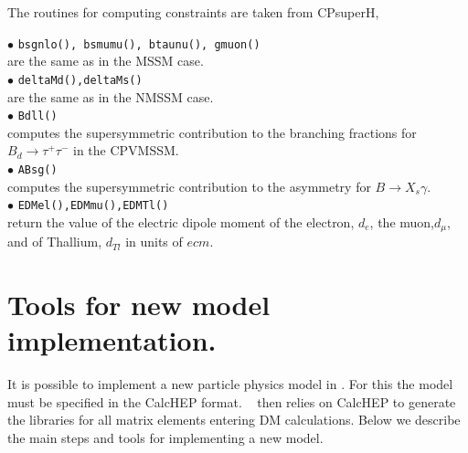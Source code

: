 \documentclass[12pt,a4paper]{article}
\begin{document}
The routines for computing constraints are taken from CPsuperH,~\cite{CPSUPERH}


\noindent
$\bullet$ {\tt bsgnlo(), bsmumu(), btaunu(), gmuon() }\\  
are the same as in the MSSM case.\\

\noindent$\bullet$ \verb|deltaMd(),deltaMs()|\\
are the same as in the NMSSM case.\\ 

\noi$\bullet$ \verb|Bdll()|\\
computes the supersymmetric contribution to the branching fractions for
${B}_d\rightarrow\tau^+\tau^-$ in the CPVMSSM.\\ 

\noi$\bullet$ \verb|ABsg()|\\
computes the supersymmetric contribution to the asymmetry for  ${B}\rightarrow X_s\gamma$.\\ 


\noindent$\bullet$ \verb|EDMel(),EDMmu(),EDMTl()|\\
return the  value of the
electric dipole moment of the electron, $d_e$, the muon,$d_\mu$,   
and of Thallium, $d_{Tl}$ in units of $ecm$. 


\section{Tools for new model implementation.}


It is possible to  implement a new particle physics  model  in \micro.
For this the model must be specified in the
CalcHEP format. \micro~ then relies on CalcHEP 
to generate the libraries for all matrix elements entering DM calculations. 
Below we describe the main steps and tools for implementing a new model.
\end{document}
